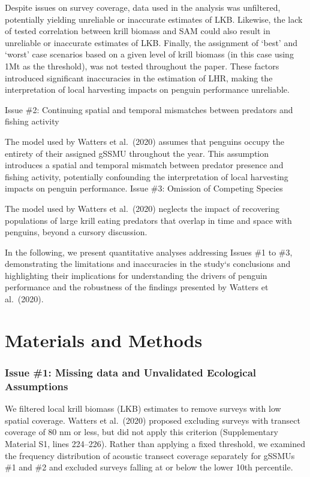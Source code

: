\documentclass[]{elsarticle} %
\begin{document}
Despite issues on survey coverage, data used in the analysis was
unfiltered, potentially yielding unreliable or inaccurate estimates of
LKB. Likewise, the lack of tested correlation between krill biomass and
SAM could also result in unreliable or inaccurate estimates of LKB.
Finally, the assignment of `best' and `worst' case scenarios based on a
given level of krill biomass (in this case using 1Mt as the threshold),
was not tested throughout the paper. These factors introduced
significant inaccuracies in the estimation of LHR, making the
interpretation of local harvesting impacts on penguin performance
unreliable.

Issue \#2: Continuing spatial and temporal mismatches between predators
and fishing activity

The model used by Watters et al.~(2020) assumes that penguins occupy the
entirety of their assigned gSSMU throughout the year. This assumption
introduces a spatial and temporal mismatch between predator presence and
fishing activity, potentially confounding the interpretation of local
harvesting impacts on penguin performance. Issue \#3: Omission of
Competing Species

The model used by Watters et al.~(2020) neglects the impact of
recovering populations of large krill eating predators that overlap in
time and space with penguins, beyond a cursory discussion.

In the following, we present quantitative analyses addressing Issues \#1
to \#3, demonstrating the limitations and inaccuracies in the study`s
conclusions and highlighting their implications for understanding the
drivers of penguin performance and the robustness of the findings
presented by Watters et al.~(2020).

\section{Materials and Methods}\label{materials-and-methods}

\subsubsection{Issue \#1: Missing data and Unvalidated Ecological
Assumptions}\label{issue-1-missing-data-and-unvalidated-ecological-assumptions}

We filtered local krill biomass (LKB) estimates to remove surveys with
low spatial coverage. Watters et al.~(2020) proposed excluding surveys
with transect coverage of 80 nm or less, but did not apply this
criterion (Supplementary Material S1, lines 224--226). Rather than
applying a fixed threshold, we examined the frequency distribution of
acoustic transect coverage separately for gSSMUs \#1 and \#2 and
excluded surveys falling at or below the lower 10th percentile.
\end{document}
